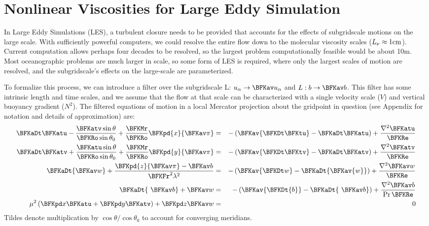 
\section{Nonlinear Viscosities for Large Eddy Simulation}
\label{sec:nonlin-visc}

In Large Eddy Simulations (LES), a turbulent closure needs to be
provided that accounts for the effects of subgridscale motions on the
large scale.  With sufficiently powerful computers, we could resolve
the entire flow down to the molecular viscosity scales
{($L_{\nu}\approx 1 \rm cm$)}.  Current computation allows perhaps
four decades to be resolved, so the largest problem computationally
feasible would be about 10m. Most oceanographic problems are much
larger in scale, so some form of LES is required, where only the
largest scales of motion are resolved, and the subgridscale's effects
on the large-scale are parameterized.

To formalize this process, we can introduce a filter over the
subgridscale L: $u_\alpha\rightarrow \BFKav u_\alpha$ and $L:
b\rightarrow \BFKav b$.  This filter has some intrinsic length and time
scales, and we assume that the flow at that scale can be characterized
with a single velocity scale ($V$) and vertical buoyancy gradient
($N^2$). The filtered equations of motion in a local Mercator
projection about the gridpoint in question (see Appendix for notation
and details of approximation) are: 
\begin{eqnarray}
\BFKaDt \BFKatu- \frac{\BFKatv
  \sin\theta}{\BFKRo\sin\theta_0}+\frac{\BFKMr}{\BFKRo}\BFKpd{x}{\BFKav\pi}
& = & -\left({\BFKav{\BFKDt \BFKtu}}-{\BFKaDt \BFKatu}\right)
+\frac{\nabla^2{\BFKatu}}{\BFKRe}\label{eq:mercat}\\
\BFKaDt\BFKatv+\frac{\BFKatu\sin\theta}{\BFKRo\sin\theta_0}
+\frac{\BFKMr}{\BFKRo}\BFKpd{y}{\BFKav\pi}
& = & -\left({\BFKav{\BFKDt \BFKtv}}-{\BFKaDt \BFKatv}\right)
+\frac{\nabla^2{\BFKatv}}{\BFKRe}\nonumber\\
\BFKaDt {\BFKav w} +\frac{\BFKpd{z}{\BFKav\pi}-\BFKav b}{\BFKFr^2\lambda^2}
& = & -\left(\BFKav{\BFKDt w}-\BFKaDt {\BFKav{w}}\right)
+\frac{\nabla^2\BFKav w}{\BFKRe}\nonumber\\
\BFKaDt{\ \BFKav b}+\BFKav w & = &
 -\left(\BFKav{\BFKDt{b}}-\BFKaDt{\ \BFKav b} \right)
+\frac{\nabla^2 \BFKav b}{\Pr\BFKRe}\nonumber \\
\mu^2\left(\BFKpd x\BFKatu  + \BFKpd y\BFKatv \right)+\BFKpd z {\BFKav w} 
& = & 0\label{eq:cont}
\end{eqnarray}
Tildes denote multiplication by $\cos\theta/\cos\theta_0$ to account
for converging meridians.

